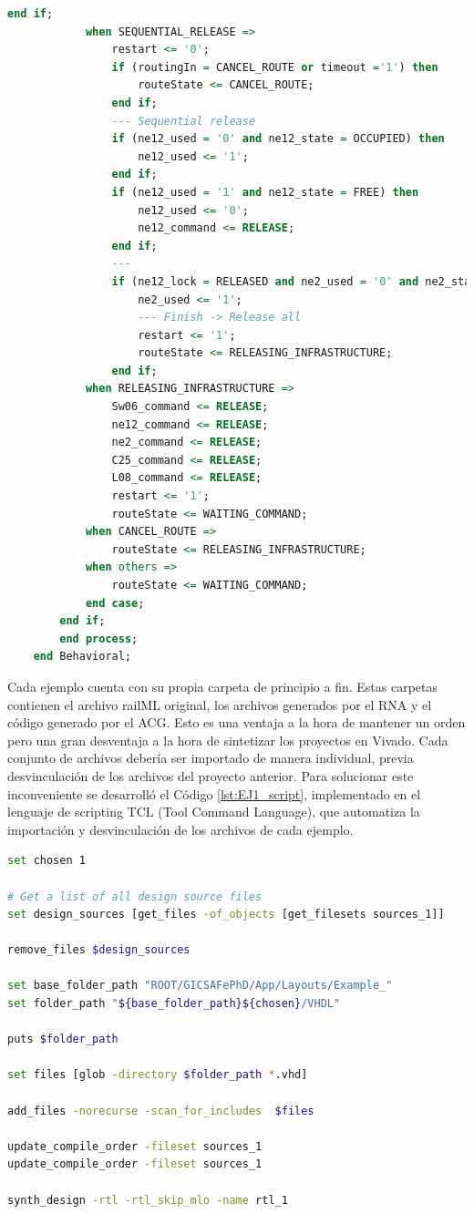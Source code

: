 \begin{lstlisting}[language = {vhdl}, caption = route\_13.vdhl, label = {lst:EJ1_vhdl}, tabsize=2, basicstyle=\footnotesize\ttfamily]
				end if;
			when SEQUENTIAL_RELEASE =>
				restart <= '0';
				if (routingIn = CANCEL_ROUTE or timeout ='1') then
					routeState <= CANCEL_ROUTE;
				end if;
				--- Sequential release
				if (ne12_used = '0' and ne12_state = OCCUPIED) then 
					ne12_used <= '1';
				end if;
				if (ne12_used = '1' and ne12_state = FREE) then
					ne12_used <= '0';
					ne12_command <= RELEASE;
				end if;
				---
				if (ne12_lock = RELEASED and ne2_used = '0' and ne2_state = OCCUPIED) then 
					ne2_used <= '1';
					--- Finish -> Release all
					restart <= '1';
					routeState <= RELEASING_INFRASTRUCTURE;
				end if;
			when RELEASING_INFRASTRUCTURE =>
				Sw06_command <= RELEASE;
				ne12_command <= RELEASE;
				ne2_command <= RELEASE;
				C25_command <= RELEASE;
				L08_command <= RELEASE;
				restart <= '1';
				routeState <= WAITING_COMMAND;
			when CANCEL_ROUTE =>
				routeState <= RELEASING_INFRASTRUCTURE;
			when others =>
				routeState <= WAITING_COMMAND;
			end case;
		end if;
		end process;
	end Behavioral;
	\end{lstlisting}
	
	
	Cada ejemplo cuenta con su propia carpeta de principio a fin. Estas carpetas contienen el archivo railML original, los archivos generados por el RNA y el código generado por el ACG. Esto es una ventaja a la hora de mantener un orden pero una gran desventaja a la hora de sintetizar los proyectos en Vivado. Cada conjunto de archivos debería ser importado de manera individual, previa desvinculación de los archivos del proyecto anterior. Para solucionar este inconveniente se desarrolló el Código \ref{lst:EJ1_script}, implementado en el lenguaje de scripting TCL (Tool Command Language), que automatiza la importación y desvinculación de los archivos de cada ejemplo.
	
	\begin{lstlisting}[language = {bash}, caption = script.tcl, label = {lst:EJ1_script}]
set chosen 1

# Get a list of all design source files
set design_sources [get_files -of_objects [get_filesets sources_1]]

remove_files $design_sources

set base_folder_path "ROOT/GICSAFePhD/App/Layouts/Example_"
set folder_path "${base_folder_path}${chosen}/VHDL"

puts $folder_path

set files [glob -directory $folder_path *.vhd]

add_files -norecurse -scan_for_includes  $files

update_compile_order -fileset sources_1
update_compile_order -fileset sources_1

synth_design -rtl -rtl_skip_mlo -name rtl_1
	\end{lstlisting}
	
